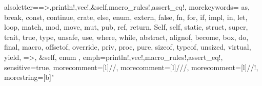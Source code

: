 {
  alsoletter={=>,println!,vec!,&self,macro_rules!,assert_eq!},
  morekeywords={
          as, break, const, continue, crate, else, enum, extern, false, fn, for,
          if, impl, in, let, loop, match, mod, move, mut, pub, ref, return,
          Self, self, static, struct, super, trait, true, type, unsafe, use,
          where, while,
          abstract, alignof, become, box, do, final, macro, offsetof, override,
          priv, proc, pure, sizeof, typeof, unsized, virtual, yield,
          =>, &self, enum
  },
  emph={println!,vec!,macro_rules!,assert_eq!},
  sensitive=true, %
  morecomment=[l]{//}, %
  morecomment=[l]{///}, %
  morecomment=[l]{//!}, %
  morestring=[b]" %
}
